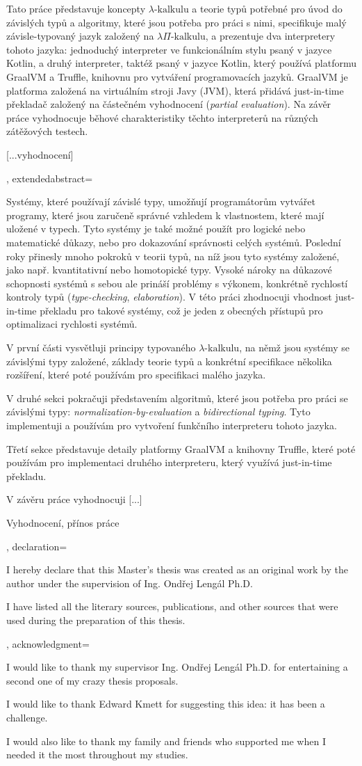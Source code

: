 {{   Tato práce představuje koncepty $\lambda\text{-kalkulu}$ a teorie typů
   potřebné pro úvod do závislých typů a algoritmy, které jsou potřeba pro práci
   s nimi, specifikuje malý závisle-typovaný jazyk založený na
   $\lambda\Pi\text{-kalkulu}$, a prezentuje dva interpretery tohoto jazyka:
   jednoduchý interpreter ve funkcionálním stylu psaný v jazyce Kotlin, a druhý
   interpreter, taktéž psaný v jazyce Kotlin, který používá platformu GraalVM a
   Truffle, knihovnu pro vytváření programovacích jazyků. GraalVM je platforma
   založená na virtuálním stroji Javy (JVM), která přidává just-in-time
   překladač založený na částečném vyhodnocení (\textit{partial evaluation}). Na
   závěr práce vyhodnocuje běhové charakteristiky těchto interpreterů na různých
   zátěžových testech.

   [...vyhodnocení]
  },
  extendedabstract={
  Systémy, které používají závislé typy, umožňují programátorům vytvářet
  programy, které jsou zaručeně správné vzhledem k vlastnostem, které mají
  uložené v typech. Tyto systémy je také možné použít pro logické nebo
  matematické důkazy, nebo pro dokazování správnosti celých systémů.  Poslední
  roky přinesly mnoho pokroků v teorii typů, na níž jsou tyto systémy založené,
  jako např. kvantitativní nebo homotopické typy. Vysoké nároky na důkazové schopnosti
  systémů s sebou ale prináší problémy s výkonem, konkrétně rychlostí kontroly
  typů (\textit{type-checking}, \textit{elaboration}). V této práci zhodnocuji
  vhodnost just-in-time překladu pro takové systémy, což je jeden z obecných
  přístupů pro optimalizaci rychlosti systémů.

  V první části vysvětluji principy typovaného $\lambda\text{-kalkulu}$, na němž
  jsou systémy se závislými typy založené, základy teorie typů a konkrétní
  specifikace několika rozšíření, které poté používám pro specifikaci malého
  jazyka.

  V druhé sekci pokračuji představením algoritmů, které jsou potřeba pro práci
  se závislými typy: \textit{normalization-by-evaluation} a
  \textit{bidirectional typing}. Tyto implementuji a používám pro vytvoření
  funkčního interpreteru tohoto jazyka.

  Třetí sekce představuje detaily platformy GraalVM a knihovny Truffle, které
  poté používám pro implementaci druhého interpreteru, který využívá
  just-in-time překladu.

  V závěru práce vyhodnocuji [...]

  Vyhodnocení, přínos práce
  },
  declaration={
    I hereby declare that this Master's thesis was created as an original work
    by the author under the supervision of Ing. Ondřej Lengál Ph.D.

    I have listed all the literary sources, publications, and other sources
    that were used during the preparation of this thesis.
  },
  acknowledgment={
    I would like to thank my supervisor Ing. Ondřej Lengál Ph.D. for entertaining a
    second one of my crazy thesis proposals.

    I would like to thank Edward Kmett for suggesting this idea: it has been a
    challenge.

    I would also like to thank my family and friends who supported me when I needed
    it the most throughout my studies.
  }
}
